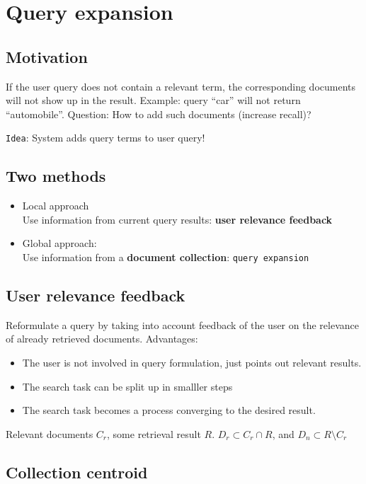 \section{Query expansion}
\subsection{Motivation}

If the user query does not contain a relevant term, the corresponding
documents will not show up in the result.
Example: query ``car'' will not return ``automobile''.
Question: How to add such documents (increase recall)?

\texttt{Idea}: System adds query terms to user query!

\subsection{Two methods}
\begin{itemize}
\item Local approach \\
  Use information from current query results: \textbf{user relevance
    feedback}
\item Global approach: \\
  Use information from a \textbf{document collection}: \texttt{query
    expansion}
\end{itemize}

\subsection{User relevance feedback}

Reformulate a query by taking into account feedback of the user on the
relevance of already retrieved documents.
Advantages:
\begin{itemize}
\item The user is not involved in query formulation, just points out
  relevant results.
\item The search task can be split up in smalller steps
\item The search task becomes a process converging to the desired
  result.
\end{itemize}

Relevant documents $ C_r $, some retrieval result $ R $.
$ D_r \subset C_r \cap R  $, and $ D_n \subset R \setminus C_r $

\subsection{Collection centroid}

